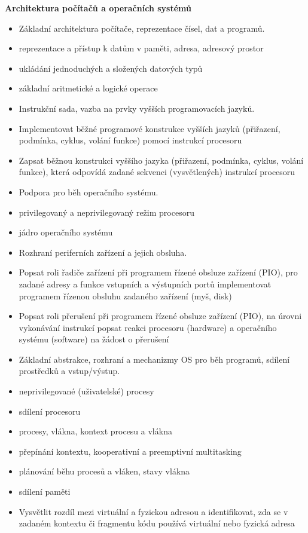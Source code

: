 \begin{tema}
\textbf{Architektura počítačů a operačních systémů}
\begin{itemize}[leftmargin=1.2em,itemsep=0pt,topsep=1pt]
  \item Základní architektura počítače, reprezentace čísel, dat a programů.
  \item reprezentace a přístup k datům v paměti, adresa, adresový prostor
  \item ukládání jednoduchých a složených datových typů
  \item základní aritmetické a logické operace
  \item Instrukční sada, vazba na prvky vyšších programovacích jazyků.
  \item Implementovat běžné programové konstrukce vyšších jazyků (přiřazení, podmínka, cyklus, volání funkce) pomocí instrukcí procesoru
  \item Zapsat běžnou konstrukci vyššího jazyka (přiřazení, podmínka, cyklus, volání funkce), která odpovídá zadané sekvenci (vysvětlených) instrukcí procesoru
  \item Podpora pro běh operačního systému.
  \item privilegovaný a neprivilegovaný režim procesoru
  \item jádro operačního systému
  \item Rozhraní periferních zařízení a jejich obsluha.
  \item Popsat roli řadiče zařízení při programem řízené obsluze zařízení (PIO), pro zadané adresy a funkce vstupních a výstupních portů implementovat programem řízenou obsluhu zadaného zařízení (myš, disk)
  \item Popsat roli přerušení při programem řízené obsluze zařízení (PIO), na úrovni vykonávání instrukcí popsat reakci procesoru (hardware) a operačního systému (software) na žádost o přerušení
  \item Základní abstrakce, rozhraní a mechanizmy OS pro běh programů, sdílení prostředků a vstup/výstup.
  \item neprivilegované (uživatelské) procesy
  \item sdílení procesoru
  \item procesy, vlákna, kontext procesu a vlákna
  \item přepínání kontextu, kooperativní a preemptivní multitasking
  \item plánování běhu procesů a vláken, stavy vlákna
  \item sdílení paměti
  \item Vysvětlit rozdíl mezi virtuální a fyzickou adresou a identifikovat, zda se v zadaném kontextu či fragmentu kódu používá virtuální nebo fyzická adresa

\end{itemize}
\end{tema}
